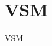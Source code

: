 \documentclass[\main/dresen_thesis.tex]{subfiles}
\begin{document}
  \section{VSM}
    \label{app:methods:vsm}
    VSM
\end{document}
